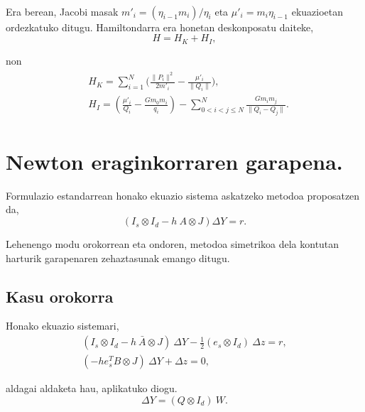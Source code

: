 \paragraph*{}Era berean, Jacobi masak $m'_i=(\eta_{i-1} m_i)/\eta_i$ eta $\mu'_i=m_i \eta_{i-1}$ ekuazioetan ordezkatuko ditugu. Hamiltondarra era honetan deskonposatu daiteke,
\begin{equation*}
H=H_K+H_I,
\end{equation*} 

non
\begin{align*}
\begin{split}
&H_K=\sum\limits_{i=1}^{N}\bigg(\frac{\|P_i\|^2}{2 m'_i} -\frac{\mu'_i}{\|Q_i\|}\bigg), \\
&H_I=\left(\frac{\mu'_i}{Q_i}-\frac{Gm_0m_i}{q_i} \right) -\sum\limits_{0< i<j\le N}^{N} \frac{G m_i m_j}{\|Q_i-Q_j\|}.
\end{split}
\end{align*}

\section{Newton eraginkorraren garapena.}
\label{erans:B3}

Formulazio estandarrean honako ekuazio sistema askatzeko metodoa proposatzen da,
\begin{equation}
\label{eqA3:1}
(I_s \otimes I_d- h \ A \otimes J) \Delta Y =r.
\end{equation}

Lehenengo modu orokorrean eta ondoren, metodoa simetrikoa dela kontutan harturik garapenaren zehaztasunak emango ditugu.

\subsection*{Kasu orokorra}
\label{serans:B31}

Honako ekuazio sistemari,
\begin{align}
\label{eqA3:2}
(I_s \otimes I_d- h \ \bar{A} \otimes J) \ \Delta Y - \frac{1}{2}(e_s \otimes I_d) \ \Delta z =r,\\
(-h e_s^T B \otimes J) \ \Delta Y+  \Delta z=0,
\end{align}

aldagai aldaketa hau,  aplikatuko diogu.
\begin{equation}
\label{eqA3:3}
 \Delta Y = (Q \otimes I_d) \ W.
\end{equation}

